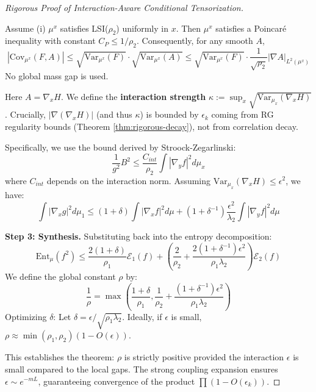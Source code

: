 \begin{proof}[Rigorous Proof of Interaction-Aware Conditional Tensorization]
\begin{lemma}
Assume (i) $\mu^x$ satisfies LSI($\rho_2$) uniformly in $x$. Then $\mu^x$ satisfies a Poincaré inequality with constant $C_P \le 1/\rho_2$. Consequently, for any smooth $A$,
\begin{equation}
|\mathrm{Cov}_{\mu^x}(F,A)| \le \sqrt{\mathrm{Var}_{\mu^x}(F)} \cdot \sqrt{\mathrm{Var}_{\mu^x}(A)} 
\le \sqrt{\mathrm{Var}_{\mu^x}(F)} \cdot \frac{1}{\sqrt{\rho_2}}|\nabla A|_{L^2(\mu^x)}
\end{equation}
No global mass gap is used.
\end{lemma}

Here $A=\nabla_x H$. We define the \textbf{interaction strength} $\kappa := \sup_x \sqrt{\mathrm{Var}_{\mu_x}(\nabla_x H)}$.
Crucially, $|\nabla(\nabla_x H)|$ (and thus $\kappa$) is bounded by $\epsilon_k$ coming from RG regularity bounds (Theorem \ref{thm:rigorous-decay}), not from correlation decay.

Specifically, we use the bound derived by Stroock-Zegarlinski:
\begin{equation}
\frac{1}{g^2} B^2 \le \frac{C_{int}}{\rho_2} \int |\nabla_y f|^2 d\mu_x
\end{equation}
where $C_{int}$ depends on the interaction norm.
Assuming $\mathrm{Var}_{\mu_x}(\nabla_x H) \le \epsilon^2$, we have:
\begin{equation}
\int |\nabla_x g|^2 d\mu_1 \le (1+\delta) \int |\nabla_x f|^2 d\mu + (1+\delta^{-1}) \frac{\epsilon^2}{\lambda_2} \int |\nabla_y f|^2 d\mu
\end{equation}

\textbf{Step 3: Synthesis.}
Substituting back into the entropy decomposition:
\begin{equation}
\mathrm{Ent}_\mu(f^2) \le \frac{2(1+\delta)}{\rho_1} \mathcal{E}_1(f) + \left( \frac{2}{\rho_2} + \frac{2(1+\delta^{-1})\epsilon^2}{\rho_1 \lambda_2} \right) \mathcal{E}_2(f)
\end{equation}
We define the global constant $\rho$ by:
\begin{equation}
\frac{1}{\rho} = \max\left( \frac{1+\delta}{\rho_1}, \frac{1}{\rho_2} + \frac{(1+\delta^{-1})\epsilon^2}{\rho_1 \lambda_2} \right)
\end{equation}
Optimizing $\delta$: Let $\delta = \epsilon / \sqrt{\rho_1 \lambda_2}$.
Ideally, if $\epsilon$ is small, $\rho \approx \min(\rho_1, \rho_2) (1 - O(\epsilon))$.

This establishes the theorem: $\rho$ is strictly positive provided the interaction $\epsilon$ is small compared to the local gaps. The strong coupling expansion ensures $\epsilon \sim e^{-m L}$, guaranteeing convergence of the product $\prod (1 - O(\epsilon_k))$.
\end{proof}



